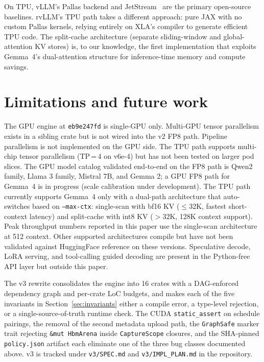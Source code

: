 On TPU, vLLM's Pallas backend and JetStream~\cite{jetstream2024} are the
primary open-source baselines. rvLLM's TPU path takes a different
approach: pure JAX with no custom Pallas kernels, relying entirely on
XLA's compiler to generate efficient TPU code. The split-cache
architecture (separate sliding-window and global-attention KV stores)
is, to our knowledge, the first implementation that exploits Gemma~4's
dual-attention structure for inference-time memory and compute savings.

\section{Limitations and future work}
\label{sec:limitations}

The GPU engine at \texttt{eb9e247fd} is single-GPU only. Multi-GPU
tensor parallelism exists in a sibling crate but is not wired into the
v2 FP8 path. Pipeline parallelism is not implemented on the GPU side.
The TPU path supports multi-chip tensor parallelism (TP\,=\,4 on v6e-4)
but has not been tested on larger pod slices. The GPU model catalog
validated end-to-end on the FP8 path is Qwen2 family, Llama 3 family,
Mistral 7B, and Gemma 2; a GPU FP8 path for Gemma~4 is in progress
(scale calibration under development). The TPU path currently supports
Gemma~4 only with a dual-path architecture that auto-switches based on
\texttt{--max-ctx}: single-scan with bf16 KV ($\le$32K, fastest
short-context latency) and split-cache with int8 KV ($>$32K, 128K
context support). Peak throughput numbers reported in this paper use
the single-scan architecture at 512 context. Other supported architectures compile but
have not been validated against HuggingFace reference on these versions.
Speculative decode, LoRA serving, and tool-calling guided decoding are
present in the Python-free API layer but outside this paper.

The v3 rewrite consolidates the engine into 16 crates with a
DAG-enforced dependency graph and per-crate LoC budgets, and makes
each of the five invariants in Section~\ref{sec:invariants} either a
compile error, a type-level rejection, or a single-source-of-truth
runtime check. The CUDA \texttt{static\_assert} on schedule pairings,
the removal of the second metadata upload path, the
\texttt{GraphSafe} marker trait rejecting
\texttt{\&mut HbmArena} inside \texttt{CaptureScope} closures, and the
SHA-pinned \texttt{policy.json} artifact each eliminate one of the
three bug classes documented above. v3 is tracked under
\texttt{v3/SPEC.md} and \texttt{v3/IMPL\_PLAN.md} in the repository.

